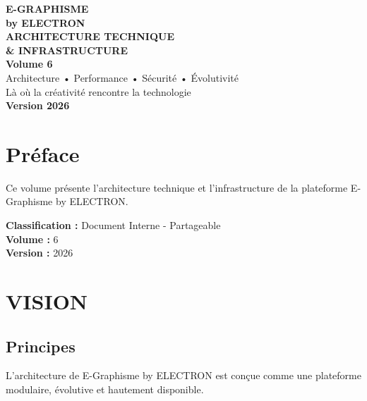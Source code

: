 \documentclass[12pt,a4paper,oneside]{book}
\begin{document}
\begin{titlepage}
\thispagestyle{empty}
\begin{center}
\vspace*{2cm}
{\Huge\bfseries\color{electronblue}E-GRAPHISME}\\[0.3cm]
{\LARGE\bfseries\color{electronpurple}by ELECTRON}\\[2cm]
\vspace{2cm}
{\huge\bfseries\color{darkbg}ARCHITECTURE TECHNIQUE}\\[0.3cm]
{\huge\bfseries\color{darkbg}\& INFRASTRUCTURE}\\[1cm]
{\Large\bfseries\color{electroncyan}Volume 6}\\[3cm]
\vspace{2cm}
{\Large\color{mediumgray}Architecture • Performance • Sécurité • Évolutivité}\\[1cm]
{\Large\color{mediumgray}Là où la créativité rencontre la technologie}\\[3cm]
{\Large\bfseries\color{electrongold}Version 2026}\\[2cm]
\vfill
\end{center}
\end{titlepage}

\frontmatter

\chapter*{Préface}
Ce volume présente l'architecture technique et l'infrastructure de la plateforme E-Graphisme by ELECTRON.

\bigskip
\textbf{Classification :} Document Interne - Partageable\\
\textbf{Volume :} 6\\
\textbf{Version :} 2026

\tableofcontents

\mainmatter

\chapter{VISION}

\section{Principes}
L'architecture de E-Graphisme by ELECTRON est conçue comme une plateforme modulaire, évolutive et hautement disponible.
\end{document}
